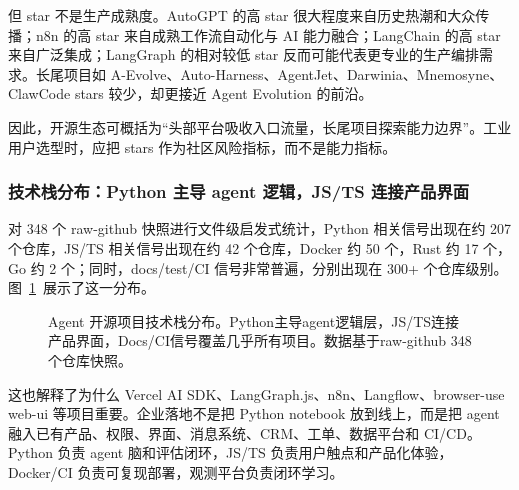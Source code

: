 但 star 不是生产成熟度。AutoGPT 的高 star 很大程度来自历史热潮和大众传播；n8n 的高 star 来自成熟工作流自动化与 AI 能力融合；LangChain 的高 star 来自广泛集成；LangGraph 的相对较低 star 反而可能代表更专业的生产编排需求。长尾项目如 A-Evolve、Auto-Harness、AgentJet、Darwinia、Mnemosyne、ClawCode stars 较少，却更接近 Agent Evolution 的前沿。

因此，开源生态可概括为``头部平台吸收入口流量，长尾项目探索能力边界''。工业用户选型时，应把 stars 作为社区风险指标，而不是能力指标。

\subsubsection{技术栈分布：Python 主导 agent 逻辑，JS/TS 连接产品界面}

对 348 个 raw-github 快照进行文件级启发式统计，Python 相关信号出现在约 207 个仓库，JS/TS 相关信号出现在约 42 个仓库，Docker 约 50 个，Rust 约 17 个，Go 约 2 个；同时，docs/test/CI 信号非常普遍，分别出现在 300+ 个仓库级别。图~\ref{fig:ch6-techstack}~展示了这一分布。

\begin{figure}[htbp]
\centering
{}
\caption{Agent 开源项目技术栈分布。Python主导agent逻辑层，JS/TS连接产品界面，Docs/CI信号覆盖几乎所有项目。数据基于raw-github 348个仓库快照。}
\label{fig:ch6-techstack}
\end{figure}

这也解释了为什么 Vercel AI SDK、LangGraph.js、n8n、Langflow、browser-use web-ui 等项目重要。企业落地不是把 Python notebook 放到线上，而是把 agent 融入已有产品、权限、界面、消息系统、CRM、工单、数据平台和 CI/CD。Python 负责 agent 脑和评估闭环，JS/TS 负责用户触点和产品化体验，Docker/CI 负责可复现部署，观测平台负责闭环学习。

